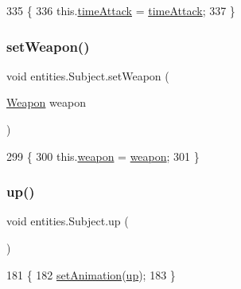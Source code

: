 \begin{DoxyCode}
335                                               \{
336         this.\mbox{\hyperlink{classentities_1_1_subject_a497b24a97e5d4835bd5f8c70584701e2}{timeAttack}} = \mbox{\hyperlink{classentities_1_1_subject_a497b24a97e5d4835bd5f8c70584701e2}{timeAttack}};
337     \}
\end{DoxyCode}
\mbox{\label{classentities_1_1_subject_ad84e9c9719aedcfc3387ddc8b3d1ecd7}} 
\subsubsection{\texorpdfstring{set\+Weapon()}{setWeapon()}}
{\footnotesize\ttfamily void entities.\+Subject.\+set\+Weapon (\begin{DoxyParamCaption}\item[{\mbox{\hyperlink{classitems_1_1weapons_1_1_weapon}{Weapon}}}]{weapon }\end{DoxyParamCaption})\hspace{0.3cm}{\ttfamily [inline]}}


\begin{DoxyCode}
299                                          \{
300         this.\mbox{\hyperlink{classentities_1_1_subject_abb65e5fdf2a2b62efa2c9b1368c83f15}{weapon}} = \mbox{\hyperlink{classentities_1_1_subject_abb65e5fdf2a2b62efa2c9b1368c83f15}{weapon}};
301     \}
\end{DoxyCode}
\mbox{\label{classentities_1_1_subject_a48b885eabce7dd717959986004da6fd8}} 
\subsubsection{\texorpdfstring{up()}{up()}}
{\footnotesize\ttfamily void entities.\+Subject.\+up (\begin{DoxyParamCaption}{ }\end{DoxyParamCaption})\hspace{0.3cm}{\ttfamily [inline]}}


\begin{DoxyCode}
181                      \{
182         \mbox{\hyperlink{classentities_1_1_animated_sprite_entity_a089bd746df0d8a9d5687240bb34af2dc}{setAnimation}}(\mbox{\hyperlink{classentities_1_1_subject_a48b885eabce7dd717959986004da6fd8}{up}});
183     \}
\end{DoxyCode}
\mbox{\label{classentities_1_1_subject_ad1b2972826fd7c76750994c8b4d2b87b}} 
